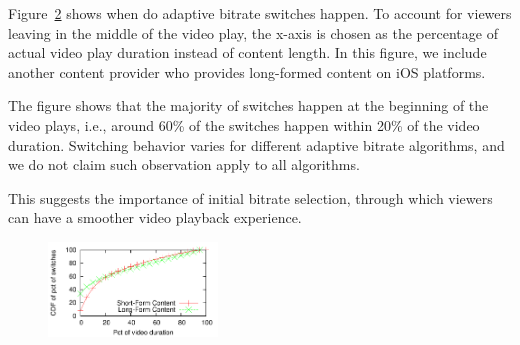 \begin{figure}[t!]
\centering
{}
\hspace{-0.6cm}
\label{fig:eval-case-study}
\end{figure}





Figure~\ref{fig:switch-time-dist} shows when do adaptive bitrate switches happen. To account for viewers leaving in the middle 
of the video play, the x-axis is chosen as the percentage of actual video play duration instead of content length. 
In this figure, we include another content provider who provides long-formed content on iOS platforms.

The figure shows that the majority of switches happen at the beginning of the video plays, i.e., around 60\% of the switches 
happen within 20\% of the video duration. Switching behavior varies for different adaptive bitrate algorithms, and we do not 
claim such observation apply to all algorithms.

This suggests the importance of initial bitrate selection, through which viewers can have a smoother video playback experience.

\begin{figure}[h!]
\centering
 \includegraphics[width=0.4\textwidth] {figures/switch-time-dist.pdf}
\label{fig:switch-time-dist}
\end{figure}

